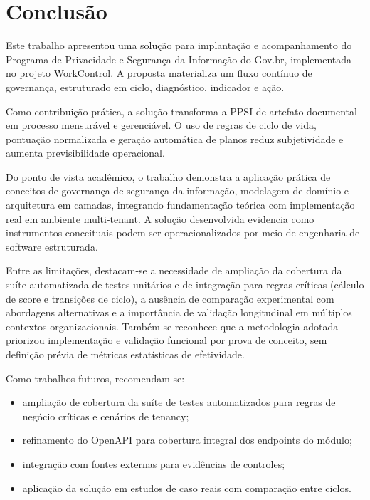 \documentclass[12pt]{article}
\begin{document}
\FloatBarrier

\section{Conclusão}

Este trabalho apresentou uma solução para implantação e acompanhamento do Programa de Privacidade e Segurança da Informação do Gov.br, implementada no projeto WorkControl. A proposta materializa um fluxo contínuo de governança, estruturado em ciclo, diagnóstico, indicador e ação.

Como contribuição prática, a solução transforma a PPSI de artefato documental em processo mensurável e gerenciável. O uso de regras de ciclo de vida, pontuação normalizada e geração automática de planos reduz subjetividade e aumenta previsibilidade operacional.

Do ponto de vista acadêmico, o trabalho demonstra a aplicação prática de conceitos de governança de segurança da informação, modelagem de domínio e arquitetura em camadas, integrando fundamentação teórica com implementação real em ambiente multi-tenant. A solução desenvolvida evidencia como instrumentos conceituais podem ser operacionalizados por meio de engenharia de software estruturada.

Entre as limitações, destacam-se a necessidade de ampliação da cobertura da suíte automatizada de testes unitários e de integração para regras críticas (cálculo de score e transições de ciclo), a ausência de comparação experimental com abordagens alternativas e a importância de validação longitudinal em múltiplos contextos organizacionais. Também se reconhece que a metodologia adotada priorizou implementação e validação funcional por prova de conceito, sem definição prévia de métricas estatísticas de efetividade.

Como trabalhos futuros, recomendam-se:

\begin{itemize}
    \item ampliação de cobertura da suíte de testes automatizados para regras de negócio críticas e cenários de tenancy;
    \item refinamento do OpenAPI para cobertura integral dos endpoints do módulo;
    \item integração com fontes externas para evidências de controles;
    \item aplicação da solução em estudos de caso reais com comparação entre ciclos.
\end{itemize}



\end{document}
